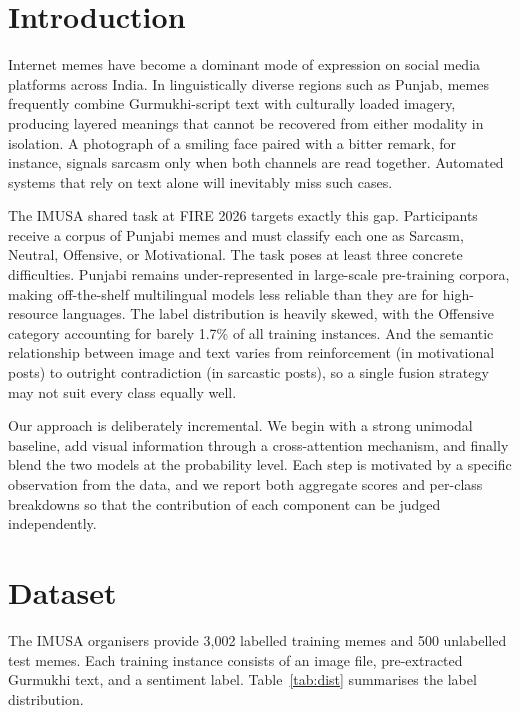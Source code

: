 \documentclass[
]{ceurart}
\begin{document}
\maketitle

\section{Introduction}

Internet memes have become a dominant mode of expression on social media platforms across India. In linguistically diverse regions such as Punjab, memes frequently combine Gurmukhi-script text with culturally loaded imagery, producing layered meanings that cannot be recovered from either modality in isolation. A photograph of a smiling face paired with a bitter remark, for instance, signals sarcasm only when both channels are read together. Automated systems that rely on text alone will inevitably miss such cases.

The IMUSA shared task at FIRE 2026 targets exactly this gap. Participants receive a corpus of Punjabi memes and must classify each one as Sarcasm, Neutral, Offensive, or Motivational. The task poses at least three concrete difficulties. Punjabi remains under-represented in large-scale pre-training corpora, making off-the-shelf multilingual models less reliable than they are for high-resource languages. The label distribution is heavily skewed, with the Offensive category accounting for barely 1.7\% of all training instances. And the semantic relationship between image and text varies from reinforcement (in motivational posts) to outright contradiction (in sarcastic posts), so a single fusion strategy may not suit every class equally well.

Our approach is deliberately incremental. We begin with a strong unimodal baseline, add visual information through a cross-attention mechanism, and finally blend the two models at the probability level. Each step is motivated by a specific observation from the data, and we report both aggregate scores and per-class breakdowns so that the contribution of each component can be judged independently.

\section{Dataset}

The IMUSA organisers provide 3,002 labelled training memes and 500 unlabelled test memes. Each training instance consists of an image file, pre-extracted Gurmukhi text, and a sentiment label. Table~\ref{tab:dist} summarises the label distribution.
\end{document}
